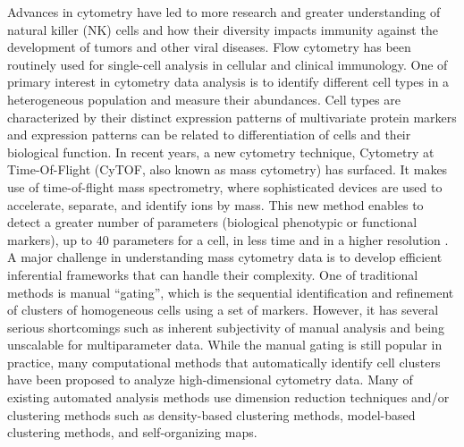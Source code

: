 \documentclass[12pt,]{article}
\begin{document}
Advances in cytometry have led to more research and greater understanding  of
natural killer (NK) cells and how their diversity impacts immunity against the
development of tumors and other viral diseases.  Flow cytometry has been
routinely used for single-cell analysis in cellular and clinical immunology.
One of primary interest in cytometry data analysis is to identify different
cell types in a heterogeneous population and measure their abundances.  Cell
types are characterized by their distinct expression patterns of multivariate
protein markers and expression patterns can be related to differentiation of
cells and their biological function.  
In recent years, a new cytometry technique, Cytometry at Time-Of-Flight (CyTOF, also known as mass cytometry) has surfaced.
It makes use of time-of-flight mass spectrometry, where sophisticated devices
are used to accelerate, separate, and identify ions by mass. This new method
enables to detect a greater number of parameters (biological phenotypic or
functional markers), up to 40 parameters for a cell, in less time and in a
higher resolution
\citep{cheung2011screening}. 
A major challenge in understanding mass cytometry data is to develop efficient
inferential frameworks that can handle their complexity. One of traditional
methods is manual ``gating'', which is the sequential identification and
refinement of clusters of homogeneous cells using a set of markers. However, it
has several serious shortcomings such as inherent subjectivity of manual
analysis and being unscalable for multiparameter data. While the manual gating
is still popular in practice, many computational methods that automatically
identify cell clusters have been proposed to analyze high-dimensional cytometry
data.  
Many of existing automated analysis methods use dimension reduction techniques
and/or clustering methods such as density-based clustering methods, model-based
clustering methods, and self-organizing maps.
\end{document}
